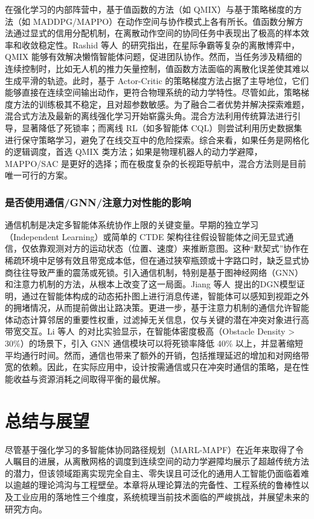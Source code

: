 \documentclass[13.5pt]{extarticle}
\begin{document}
在强化学习的内部阵营中，基于值函数的方法（如 QMIX）与基于策略梯度的方法（如 MADDPG/MAPPO）在动作空间与协作模式上各有所长。值函数分解方法通过显式的信用分配机制，在离散动作空间的协同任务中表现出了极高的样本效率和收敛稳定性。Rashid 等人~\cite{rashid2018qmix}的研究指出，在星际争霸等复杂的离散博弈中，QMIX 能够有效解决懒惰智能体问题，促进团队协作。然而，当任务涉及精细的连续控制时，比如无人机的推力矢量控制，值函数方法面临的离散化误差使其难以生成平滑的轨迹。此时，基于 Actor-Critic 的策略梯度方法占据了主导地位，它们能够直接在连续空间输出动作，更符合物理系统的动力学特性。尽管如此，策略梯度方法的训练极其不稳定，且对超参数敏感。为了融合二者优势并解决探索难题，混合式方法及最新的离线强化学习开始崭露头角。混合方法利用传统算法进行引导，显著降低了死锁率；而离线 RL（如多智能体 CQL）则尝试利用历史数据集进行保守策略学习，避免了在线交互中的危险探索。综合来看，如果任务是网格化的逻辑调度，首选 QMIX 类方法；如果是物理机器人的动力学避障，MAPPO/SAC 是更好的选择；而在极度复杂的长视距导航中，混合方法则是目前唯一可行的方案。

\subsubsection{是否使用通信/GNN/注意力对性能的影响}

通信机制是决定多智能体系统协作上限的关键变量。早期的独立学习（Independent Learning）或简单的 CTDE 架构往往假设智能体之间无显式通信，仅依靠观测对方的运动状态（位置、速度）来推断意图。这种“默契式”协作在稀疏环境中足够有效且带宽成本低，但在通过狭窄瓶颈或十字路口时，缺乏显式协商往往导致严重的震荡或死锁。引入通信机制，特别是基于图神经网络（GNN）和注意力机制的方法，从根本上改变了这一局面。Jiang 等人~\cite{jiang2018graph}提出的DGN模型证明，通过在智能体构成的动态拓扑图上进行消息传递，智能体可以感知到视距之外的拥堵情况，从而提前做出让路决策。更进一步，基于注意力机制的通信允许智能体动态计算邻居的重要性权重，过滤掉无关信息，仅与关键的潜在冲突对象进行高带宽交互。Li 等人~\cite{li2020graph}的对比实验显示，在智能体密度极高（Obstacle Density > 30\%）的场景下，引入 GNN 通信模块可以将死锁率降低 40\% 以上，并显著缩短平均通行时间。然而，通信也带来了额外的开销，包括推理延迟的增加和对网络带宽的依赖。因此，在实际应用中，设计按需通信或只在冲突时通信的策略，是在性能收益与资源消耗之间取得平衡的最优解。

\section{总结与展望}

尽管基于强化学习的多智能体协同路径规划（MARL-MAPF）在近年来取得了令人瞩目的进展，从离散网格的调度到连续空间的动力学避障均展示了超越传统方法的潜力，但该领域距离实现完全自主、零失误且可泛化的通用人工智能仍面临着难以逾越的理论鸿沟与工程壁垒。本章将从理论算法的完备性、工程系统的鲁棒性以及工业应用的落地性三个维度，系统梳理当前技术面临的严峻挑战，并展望未来的研究方向。
\end{document}
